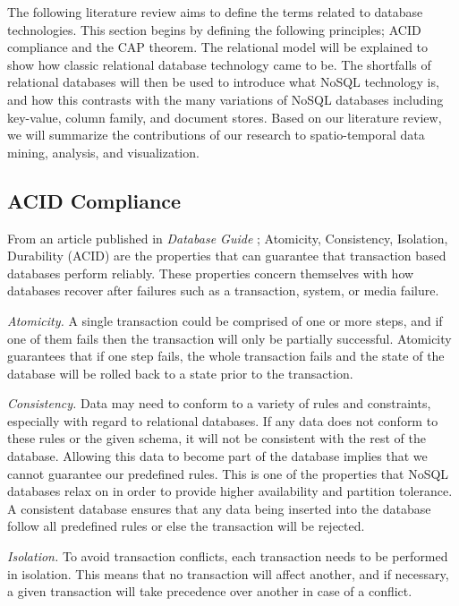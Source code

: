 The following literature review aims to define the terms related to database technologies. This section begins by defining the following principles; ACID compliance and the CAP theorem. The relational model will be explained to show how classic relational database technology came to be. The shortfalls of relational databases will then be used to introduce what NoSQL technology is, and how this contrasts with the many variations of NoSQL databases including key-value, column family, and document stores. Based on our literature review, we will summarize the contributions of our research to spatio-temporal data mining, analysis, and visualization.

\subsection{ACID Compliance}
\label{sec:acid}

From an article published in \emph{Database Guide} \cite{acid}; Atomicity, Consistency, Isolation, Durability (ACID) are the properties that can guarantee that transaction based databases perform reliably. These properties concern themselves with how databases recover after failures such as a transaction, system, or media failure.

\textit{Atomicity. }
A single transaction could be comprised of one or more steps, and if one of them fails then the transaction will only be partially successful. Atomicity guarantees that if one step fails, the whole transaction fails and the state of the database will be rolled back to a state prior to the transaction.

\textit{Consistency. }
Data may need to conform to a variety of rules and constraints, especially with regard to relational databases. If any data does not conform to these rules or the given schema, it will not be consistent with the rest of the database. Allowing this data to become part of the database implies that we cannot guarantee our predefined rules. This is one of the properties that NoSQL databases relax on in order to provide higher availability and partition tolerance. A consistent database ensures that any data being inserted into the database follow all predefined rules or else the transaction will be rejected.

\textit{Isolation. }
To avoid transaction conflicts, each transaction needs to be performed in isolation. This means that no transaction will affect another, and if necessary, a given transaction will take precedence over another in case of a conflict.

